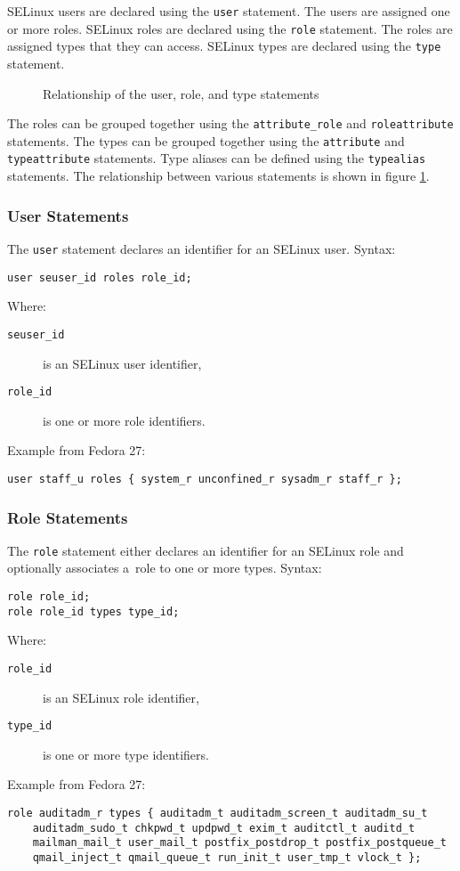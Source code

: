 SELinux users are declared using the \texttt{user} statement. The users are
assigned one or more roles. SELinux roles are declared using the \texttt{role}
statement. The roles are assigned types that they can access. SELinux types are
declared using the \texttt{type} statement.

\begin{figure}
    \centering
    \label{fig:userroletype}
    
    \caption{Relationship of the user, role, and type statements}
\end{figure}

The roles can be grouped together using the \texttt{attribute\_role} and
\texttt{roleattribute} statements. The types can be grouped together using the
\texttt{attribute} and \texttt{typeattribute} statements. Type aliases can be
defined using the \texttt{typealias} statements. The relationship between
various statements is shown in figure \ref{fig:userroletype}.

\subsubsection{User Statements}
The \texttt{user} statement declares an identifier for an SELinux user. Syntax:
\begin{lstlisting}[language=te]
user seuser_id roles role_id;
\end{lstlisting}
Where:
\begin{description}
    \item [\texttt{seuser\_id}] is an SELinux user identifier,
    \item [\texttt{role\_id}] is one or more role identifiers.
\end{description}
Example from Fedora 27:
\begin{lstlisting}[language=te]
user staff_u roles { system_r unconfined_r sysadm_r staff_r };
\end{lstlisting}

\subsubsection{Role Statements}
The \texttt{role} statement either declares an identifier for an SELinux role
and optionally associates a~role to one or more types. Syntax:
\begin{lstlisting}[language=te]
role role_id;
role role_id types type_id;
\end{lstlisting}
Where:
\begin{description}
    \item [\texttt{role\_id}] is an SELinux role identifier,
    \item [\texttt{type\_id}] is one or more type identifiers.
\end{description}
Example from Fedora 27:
\begin{lstlisting}[language=te]
role auditadm_r types { auditadm_t auditadm_screen_t auditadm_su_t
    auditadm_sudo_t chkpwd_t updpwd_t exim_t auditctl_t auditd_t
    mailman_mail_t user_mail_t postfix_postdrop_t postfix_postqueue_t
    qmail_inject_t qmail_queue_t run_init_t user_tmp_t vlock_t };
\end{lstlisting}

